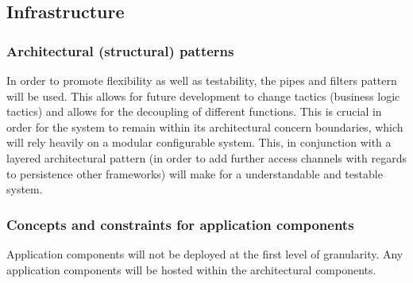 \documentclass{article}
\begin{document}
	\subsection{Infrastructure}

	\subsubsection{Architectural (structural) patterns}

	In order to promote flexibility as well as testability, the pipes and filters pattern will be used. This allows for future development to change tactics (business logic tactics) and allows for the decoupling of different functions. This is crucial in order for the system to remain within its architectural concern boundaries, which will rely heavily on a modular configurable system. This, in conjunction with a layered architectural pattern (in order to add further access channels with regards to persistence other frameworks) will make for a understandable and testable system.

	\subsubsection{Concepts and constraints for application components}

	Application components will not be deployed at the first level of granularity. Any application components will be hosted within the architectural components.


	


	
\end{document}
